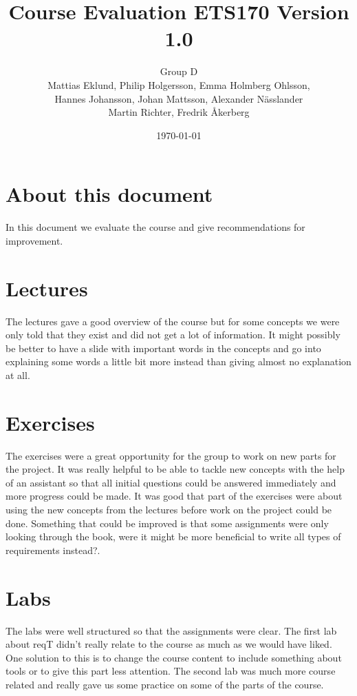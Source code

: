 \documentclass[a4paper]{article}
\title{Course Evaluation ETS170 Version 1.0}
\author{Group D\\ Mattias Eklund, Philip Holgersson, Emma Holmberg Ohlsson,\\ Hannes Johansson, Johan Mattsson, Alexander Nässlander\\Martin Richter, Fredrik Åkerberg}
\date{\today}
\begin{document}
	\maketitle
	\thispagestyle{empty}
	\setcounter{page}{0}
	\pagebreak
	\tableofcontents
	\pagebreak
	
	\section{About this document}
	In this document we evaluate the course and give recommendations for improvement.


	
	\section{Lectures}
	The lectures gave a good overview of the course but for some concepts we were only told that they exist and did not get a lot of information. It might possibly be better to have a slide with important words in the concepts and go into explaining some words a little bit more instead than giving almost no explanation at all.

	\section{Exercises}
	The exercises were a great opportunity for the group to work on new parts for the project. It was really helpful to be able to tackle new concepts with the help of an assistant so that all initial questions could be answered immediately and more progress could be made.
	It was good that part of the exercises were about using the new concepts from the lectures before work on the project could be done.
	Something that could be improved is that some assignments were only looking through the book, were it might be more beneficial to write all types of requirements instead?.

	\section{Labs}
	The labs were well structured so that the assignments were clear. The first lab about reqT didn't really relate to the course as much as we would have liked. One solution to this is to change the course content to include something about tools or to give this part less attention. The second lab was much more course related and really gave us some practice on some of the parts of the course.
\end{document}
